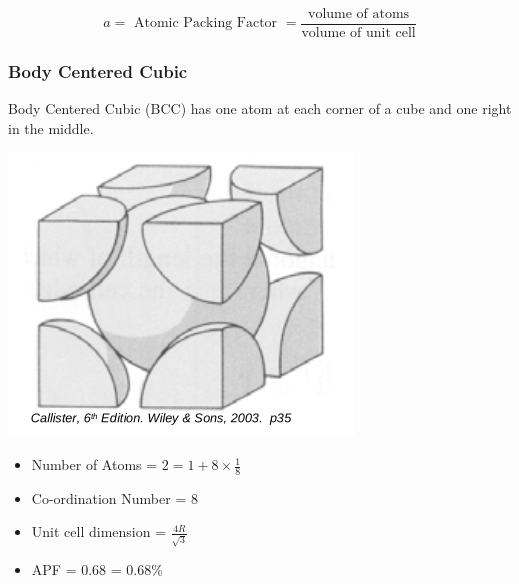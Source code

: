 \documentclass[12pt]{article}
\begin{document}
\begin{equation*}
  a = \text{ Atomic Packing Factor } = \frac{\text{volume of atoms}}{\text{volume of unit cell}}
\end{equation*}

\subsubsection{Body Centered Cubic} 
Body Centered Cubic (BCC) has one atom at each corner of a cube and one right in the middle.
\begin{marginfigure}
  \vspace{ -1cm }
  \includegraphics[scale=0.15]{bcc}
\end{marginfigure}

\begin{itemize}
  \item Number of Atoms = $2 = 1 + 8 \times \frac{1}{8}$
  \item Co-ordination Number = 8 
  \item Unit cell dimension = $\frac{4R}{\sqrt{3}}$
  \item APF = 0.68 = 0.68\%
\end{itemize}
\end{document}

